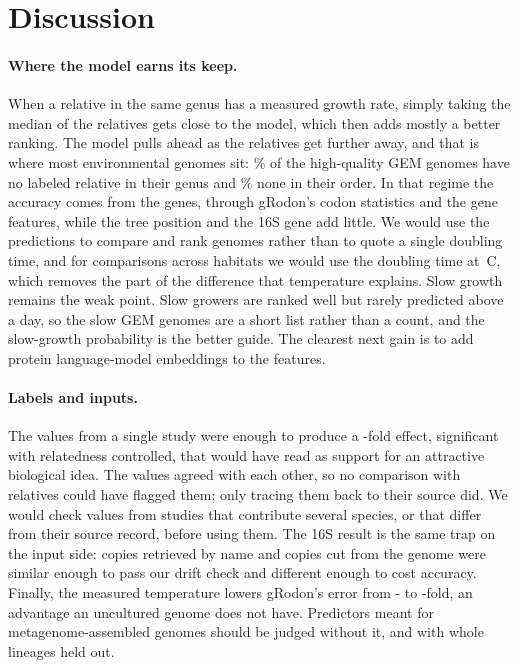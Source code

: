\section{Discussion}
\paragraph{Where the model earns its keep.} When a relative in the same genus has a measured growth rate, simply taking the
median of the relatives gets close to the model, which then adds mostly a better ranking. The model pulls ahead as the
relatives get further away, and that is where most environmental genomes sit: \GEMShareNoGenus\% of the high-quality GEM
genomes have no labeled relative in their genus and \GEMShareNewOrder\% none in their order. In that regime the accuracy comes
from the genes, through gRodon's codon statistics and the gene features, while the tree position and the 16S gene add
little. We would use the predictions to compare and rank genomes rather than to quote a single doubling time, and for
comparisons across habitats we would use the doubling time at \TRefC\,\textdegree C, which removes the part of the difference
that temperature explains. Slow growth remains the weak point. Slow growers are ranked well but rarely predicted above a day,
so the \GEMNSlow slow GEM genomes are a short list rather than a count, and the slow-growth probability is the better guide.
The clearest next gain is to add protein language-model embeddings to the features.

\paragraph{Labels and inputs.} The \NExcludedKevbrinaWord values from a single study were enough to produce a \KevFoldWith-fold effect, significant
with relatedness controlled, that would have read as support for an attractive biological idea. The values agreed with each
other, so no comparison with relatives could have flagged them; only tracing them back to their source did. We would check
values from studies that contribute several species, or that differ from their source record, before using them. The 16S
result is the same trap on the input side: copies retrieved by name and copies cut from the genome were similar enough to pass
our drift check and different enough to cost accuracy. Finally, the measured temperature lowers gRodon's error from
\RelGRodonNoTempErr- to \RelGRodonErr-fold, an advantage an uncultured genome does not have. Predictors meant
for metagenome-assembled genomes should be judged without it, and with whole lineages held out.

